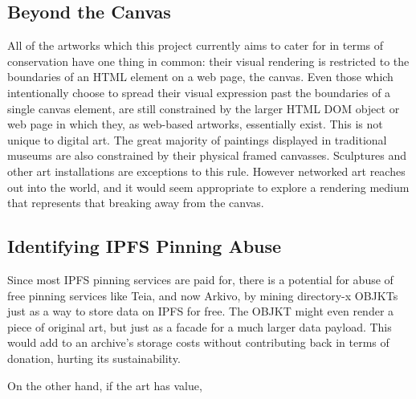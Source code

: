 \subsection{Beyond the Canvas}

All of the artworks which this project currently aims to cater for in terms of conservation have one thing in common: their visual rendering is restricted to the boundaries of an HTML element on a web page, the canvas. Even those which intentionally choose to spread their visual expression past the boundaries of a single canvas element, are still constrained by the larger HTML DOM object or web page in which they, as web-based artworks, essentially exist. This is not unique to digital art. The great majority of paintings displayed in traditional museums are also constrained by their physical framed canvasses. Sculptures and other art installations are exceptions to this rule. However networked art reaches out into the world, and it would seem appropriate to explore a rendering medium that represents that breaking away from the canvas.


\subsection{Identifying IPFS Pinning Abuse}

Since most IPFS pinning services are paid for, there is a potential for abuse of free pinning services like Teia, and now Arkivo, by mining directory-x OBJKTs just as a way to store data on IPFS for free. The OBJKT might even render a piece of original art, but just as a facade for a much larger data payload. This would add to an archive's storage costs without contributing back in terms of donation, hurting its sustainability.


On the other hand, if the art has value, 

